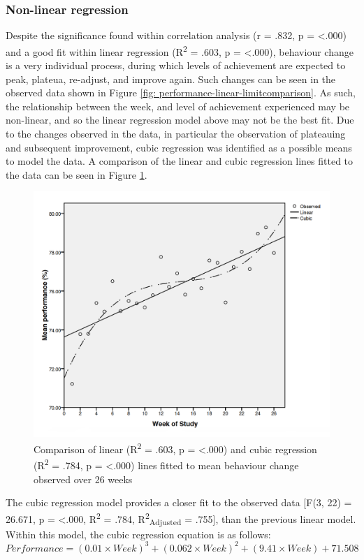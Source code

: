 \subsubsection{Non-linear regression}
Despite the significance found within correlation analysis (r = .832, p = \textless .000) and a good fit within linear regression (R\textsuperscript{2} = .603, p = \textless.000), behaviour change is a very individual process, during which levels of achievement are expected to peak, plateua, re-adjust, and improve again. Such changes can be seen in the observed data shown in Figure \ref{fig: performance-linear-limitcomparison}. As such, the relationship between the week, and level of achievement experienced may be non-linear, and so the linear regression model above may not be the best fit. Due to the changes observed in the data, in particular the observation of plateauing and subsequent improvement, cubic regression was identified as a possible means to model the data. A comparison of the linear and cubic regression lines fitted to the data can be seen in Figure \ref{fig: performance-cublic-linear-limited}.
 \begin{figure}[h]
    \centering
    \includegraphics[scale=0.25, angle=0]{Files/prevention-study-3/figures/performance-cublic-linear-limited}
    \caption{Comparison of linear (R\textsuperscript{2} = .603, p = \textless.000) and cubic regression (R\textsuperscript{2} = .784, p = \textless.000) lines fitted to mean behaviour change observed over 26 weeks}
    \label{fig: performance-cublic-linear-limited}
\end{figure}
The cubic regression model provides a closer fit to the observed data [F(3, 22) = 26.671, p = \textless.000, R\textsuperscript{2} = .784, R\textsuperscript{2}\textsubscript{Adjusted} = .755], than the previous linear model. Within this model, the cubic regression equation is as follows:
\begin{equation}
Performance = \left(0.01 \times Week\right)^{3} +  \left(0.062 \times Week\right)^{2} +  \left(9.41 \times Week \right) +  71.508
          \label{eq: calc-performance-notlimited-behaviour-change}
\end{equation}

